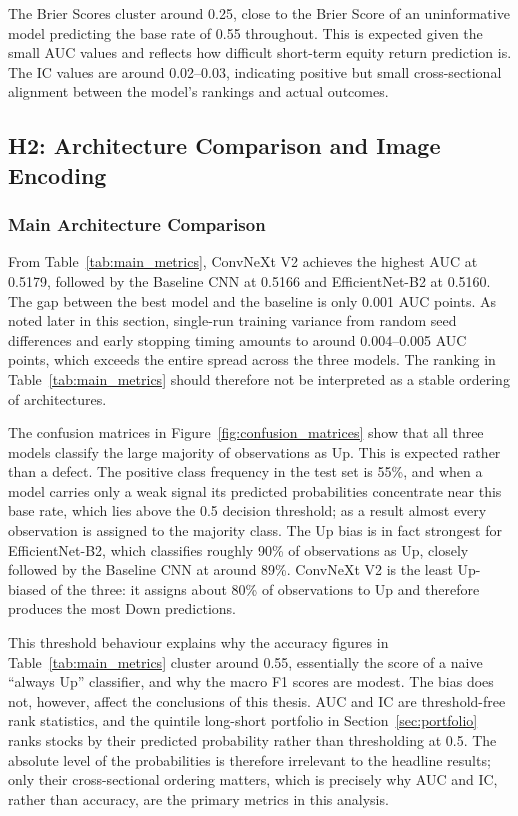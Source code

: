 The Brier Scores cluster around 0.25, close to the Brier Score of an uninformative model predicting the base rate of 0.55 throughout. This is expected given the small AUC values and reflects how difficult short-term equity return prediction is. The IC values are around 0.02--0.03, indicating positive but small cross-sectional alignment between the model's rankings and actual outcomes.

\subsection{H2: Architecture Comparison and Image Encoding}
\label{sec:res_h2}

\subsubsection{Main Architecture Comparison}

From Table~\ref{tab:main_metrics}, ConvNeXt V2 achieves the highest AUC at 0.5179, followed by the Baseline CNN at 0.5166 and EfficientNet-B2 at 0.5160. The gap between the best model and the baseline is only 0.001 AUC points. As noted later in this section, single-run training variance from random seed differences and early stopping timing amounts to around 0.004--0.005 AUC points, which exceeds the entire spread across the three models. The ranking in Table~\ref{tab:main_metrics} should therefore not be interpreted as a stable ordering of architectures.

The confusion matrices in Figure~\ref{fig:confusion_matrices} show that all three models classify the large majority of observations as Up. This is expected rather than a defect. The positive class frequency in the test set is 55\%, and when a model carries only a weak signal its predicted probabilities concentrate near this base rate, which lies above the 0.5 decision threshold; as a result almost every observation is assigned to the majority class. The Up bias is in fact strongest for EfficientNet-B2, which classifies roughly 90\% of observations as Up, closely followed by the Baseline CNN at around 89\%. ConvNeXt V2 is the least Up-biased of the three: it assigns about 80\% of observations to Up and therefore produces the most Down predictions.

This threshold behaviour explains why the accuracy figures in Table~\ref{tab:main_metrics} cluster around 0.55, essentially the score of a naive ``always Up'' classifier, and why the macro F1 scores are modest. The bias does not, however, affect the conclusions of this thesis. AUC and IC are threshold-free rank statistics, and the quintile long-short portfolio in Section~\ref{sec:portfolio} ranks stocks by their predicted probability rather than thresholding at 0.5. The absolute level of the probabilities is therefore irrelevant to the headline results; only their cross-sectional ordering matters, which is precisely why AUC and IC, rather than accuracy, are the primary metrics in this analysis.


